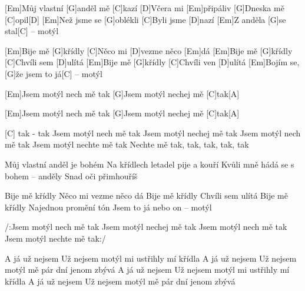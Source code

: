 
[Em]Můj vlastní [G]anděl mě [C]kazí
[D]Včera mi [Em]připáliv
[G]Dneska mě [C]opil[D]
[Em]Než jsme se [G]oblékli
[C]Byli jsme [D]nazí
[Em]Z anděla [G]se stal[C] – motýl

[Em]Bije mě [G]křídly
[C]Něco mi [D]vezme něco [Em]dá
[Em]Bije mě [G]křídly
[C]Chvíli sem [D]ulítá
[Em]Bije mě [G]křídly
[C]Chvíli ven [D]ulítá
[Em]Bojím se, [G]\null že jsem to já[C] – motýl

[Em]Jsem motýl nech mě tak
[G]Jsem motýl nechej mě [C]tak[A]

[Em]Jsem motýl nech mě tak
[G]Jsem motýl nechej mě [C]tak[A]

[C] tak - tak
\columnbreak
Jsem motýl nech mě tak
Jsem motýl nechej mě tak
Jsem motýl nech mě tak
Jsem motýl nechte mě tak
Nechte mě tak, tak, tak, tak, tak

Můj vlastní anděl je bohém
Na křídlech letadel pije a kouří
Kvůli mně hádá se s bohem – anděly
Snad oči přimhouříš

Bije mě křídly
Něco mi vezme něco dá
Bije mě křídly
Chvíli sem ulítá
Bije mě křídly
Najednou promění tón
Jsem to já nebo on – motýl

/:Jsem motýl nech mě tak
Jsem motýl nechej mě tak
Jsem motýl nech mě tak
Jsem motýl nechte mě tak:/

A já už nejsem
Už nejsem motýl mi ustřihly mí křídla
A já už nejsem
Už nejsem motýl mě pár dní jenom zbývá
A já už nejsem
Už nejsem motýl mi ustřihly mí křídla
A já už nejsem
Už nejsem motýl mě pár dní jenom zbývá
